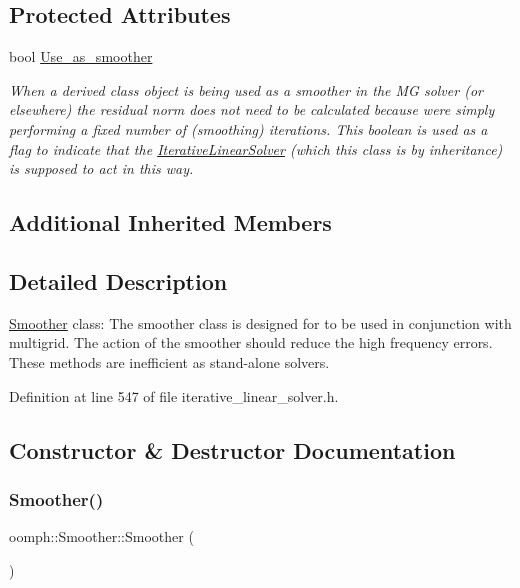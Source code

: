 \subsection*{Protected Attributes}
\begin{DoxyCompactItemize}
\item 
bool \hyperlink{classoomph_1_1Smoother_aa789c91e11408d9ffd94c237e4a729b7}{Use\+\_\+as\+\_\+smoother}
\begin{DoxyCompactList}\small\item\em When a derived class object is being used as a smoother in the MG solver (or elsewhere) the residual norm does not need to be calculated because we\textquotesingle{}re simply performing a fixed number of (smoothing) iterations. This boolean is used as a flag to indicate that the \hyperlink{classoomph_1_1IterativeLinearSolver}{Iterative\+Linear\+Solver} (which this class is by inheritance) is supposed to act in this way. \end{DoxyCompactList}\end{DoxyCompactItemize}
\subsection*{Additional Inherited Members}


\subsection{Detailed Description}
\hyperlink{classoomph_1_1Smoother}{Smoother} class\+: The smoother class is designed for to be used in conjunction with multigrid. The action of the smoother should reduce the high frequency errors. These methods are inefficient as stand-\/alone solvers. 

Definition at line 547 of file iterative\+\_\+linear\+\_\+solver.\+h.



\subsection{Constructor \& Destructor Documentation}
\mbox{\label{classoomph_1_1Smoother_ae5c884d6c74054c5fdfe8a691293e3be}} 
\subsubsection{\texorpdfstring{Smoother()}{Smoother()}}
{\footnotesize\ttfamily oomph\+::\+Smoother\+::\+Smoother (\begin{DoxyParamCaption}{ }\end{DoxyParamCaption})\hspace{0.3cm}{\ttfamily [inline]}}



